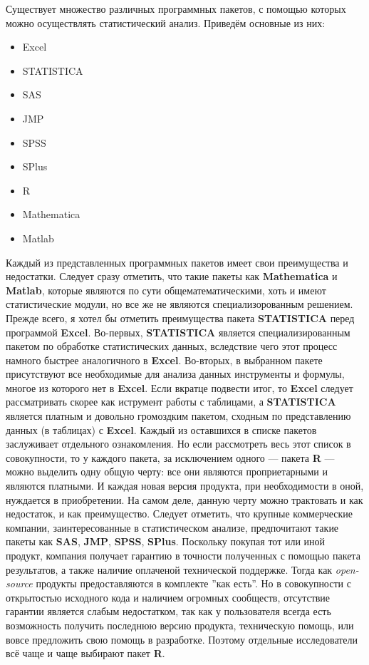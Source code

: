 Существует множество различных программных пакетов, с помощью которых можно осуществлять статистический анализ. Приведём основные из них:
\begin{itemize}
\item Excel
\item STATISTICA
\item SAS
\item JMP
\item SPSS
\item SPlus
\item R
\item Mathematica
\item Matlab
\end{itemize}
Каждый из представленных программных пакетов имеет свои преимущества и недостатки. Следует сразу отметить, что такие пакеты как \textbf{Mathematica} и \textbf{Matlab}, которые являются по сути общематематическими, хоть и имеют статистические модули, но все же не являются специализорованным решением. Прежде всего, я хотел бы отметить преимущества пакета \textbf{STATISTICA} перед программой \textbf{Excel}. Во-первых, \textbf{STATISTICA} является специализированным пакетом по обработке статистических данных, вследствие чего этот процесс намного быстрее аналогичного в \textbf{Excel}. Во-вторых, в выбранном пакете присутствуют все необходимые для анализа данных инструменты и формулы, многое из которого нет в \textbf{Excel}. Если вкратце подвести итог, то \textbf{Excel} следует рассматривать скорее как иструмент работы с таблицами, а \textbf{STATISTICA} является платным и довольно громоздким пакетом, сходным по представлению данных (в таблицах) с \textbf{Excel}. Каждый из оставшихся в списке пакетов заслуживает отдельного ознакомления. Но если рассмотреть весь этот список в совокупности, то у каждого пакета, за исключением одного --- пакета \textbf{R} --- можно выделить одну общую черту: все они являются проприетарными и являются платными. И каждая новая версия продукта, при необходимости в оной, нуждается в приобретении. На самом деле, данную черту можно трактовать и как недостаток, и как преимущество. Следует отметить, что крупные коммерческие компании, заинтересованные в статистическом анализе, предпочитают такие пакеты как \textbf{SAS}, \textbf{JMP}, \textbf{SPSS}, \textbf{SPlus}. Поскольку покупая тот или иной продукт, компания получает гарантию в точности полученных с помощью пакета результатов, а также наличие оплаченой технической поддержке. Тогда как \textit{open-source} продукты предоставляются в комплекте ''как есть''. Но в совокупности с открытостью исходного кода и наличием огромных сообществ, отсутствие гарантии является слабым недостатком, так как у пользователя всегда есть возможность получить последнюю версию продукта, техническую помощь, или вовсе предложить свою помощь в разработке. Поэтому отдельные исследователи всё чаще и чаще выбирают пакет \textbf{R}.

